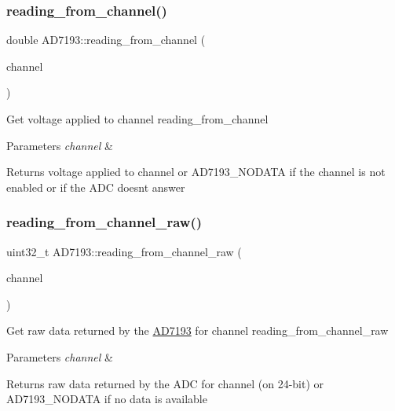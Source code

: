 \subsubsection{\texorpdfstring{reading\+\_\+from\+\_\+channel()}{reading\_from\_channel()}}
{\footnotesize\ttfamily double A\+D7193\+::reading\+\_\+from\+\_\+channel (\begin{DoxyParamCaption}\item[{A\+D7193\+::channel\+\_\+t}]{channel }\end{DoxyParamCaption})}

Get voltage applied to channel  reading\+\_\+from\+\_\+channel 
\begin{DoxyParams}{Parameters}
{\em channel} & \\
\hline
\end{DoxyParams}
\begin{DoxyReturn}{Returns}
voltage applied to channel or A\+D7193\+\_\+\+N\+O\+D\+A\+TA if the channel is not enabled or if the A\+DC doesn\textquotesingle{}t answer 
\end{DoxyReturn}
\mbox{\label{classAD7193_a1fee5a5abade344e7c1f5966ffebfddb}} 
\subsubsection{\texorpdfstring{reading\+\_\+from\+\_\+channel\+\_\+raw()}{reading\_from\_channel\_raw()}}
{\footnotesize\ttfamily uint32\+\_\+t A\+D7193\+::reading\+\_\+from\+\_\+channel\+\_\+raw (\begin{DoxyParamCaption}\item[{A\+D7193\+::channel\+\_\+t}]{channel }\end{DoxyParamCaption})}

Get raw data returned by the \hyperlink{classAD7193}{A\+D7193} for channel  reading\+\_\+from\+\_\+channel\+\_\+raw 
\begin{DoxyParams}{Parameters}
{\em channel} & \\
\hline
\end{DoxyParams}
\begin{DoxyReturn}{Returns}
raw data returned by the A\+DC for channel (on 24-\/bit) or A\+D7193\+\_\+\+N\+O\+D\+A\+TA if no data is available 
\end{DoxyReturn}
\mbox{\label{classAD7193_a387482f8e82841faf32611b5044fbc52}} 
